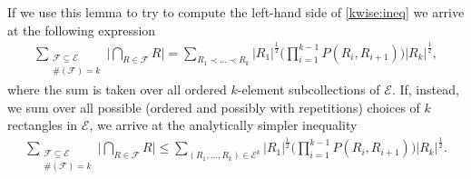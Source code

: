 \documentclass[oneside]{amsart}
\theoremstyle{definition}
\theoremstyle{plain}
\numberwithin{equation}{section}
\numberwithin{theorem}{section}
\begin{document}
If we use this lemma to try to compute the left-hand side of \eqref{kwise:ineq}
we arrive at the following expression
\begin{align*}
  \sum_{\substack{
    \mathcal{F} \subseteq \mathcal{E} \\
    \#(\mathcal{F}) = k
  }} \Bigg|\bigcap_{R \in \mathcal{F}} R \Bigg| =
  \sum_{R_1 \prec \dots \prec R_k} |R_1|^{\frac{1}{2}} \Bigg(
      \prod_{i=1}^{k-1} P(R_i, R_{i+1})
    \Bigg) |R_k|^{\frac{1}{2}},
\end{align*}
where the sum is taken over all ordered $k$-element subcollections of
$\mathcal{E}$.
If, instead, we sum over all possible (ordered and possibly with repetitions)
choices of $k$ rectangles in $\mathcal{E}$, we arrive at the analytically
simpler inequality
\begin{align*}
  \sum_{\substack{
    \mathcal{F} \subseteq \mathcal{E} \\
    \#(\mathcal{F}) = k
  }} \Bigg|\bigcap_{R \in \mathcal{F}} R \Bigg| \leq
  \sum_{(R_1, \dots, R_k) \in \mathcal{E}^k}
  |R_1|^{\frac{1}{2}} \Bigg(
      \prod_{i=1}^{k-1} P(R_i, R_{i+1})
    \Bigg) |R_k|^{\frac{1}{2}}.
\end{align*}
\end{document}
